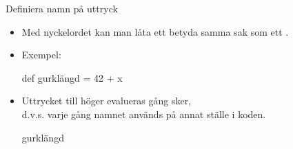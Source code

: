 \documentclass{simpleslides}
\begin{document}
    
    
    \begin{Slide}{Definiera namn på uttryck}
    \begin{itemize}
    \item Med nyckelordet  kan man låta ett  betyda samma sak som ett .
    \item Exempel:
    \begin{Code}
    def gurklängd = 42 + x
    \end{Code}
    \item Uttrycket till höger evalueras  gång  sker,\\
    d.v.s. varje gång namnet används på annat ställe i koden.
    \begin{Code}
    gurklängd
    \end{Code}
    
    \end{itemize}
    \end{Slide}
    
\end{document}
